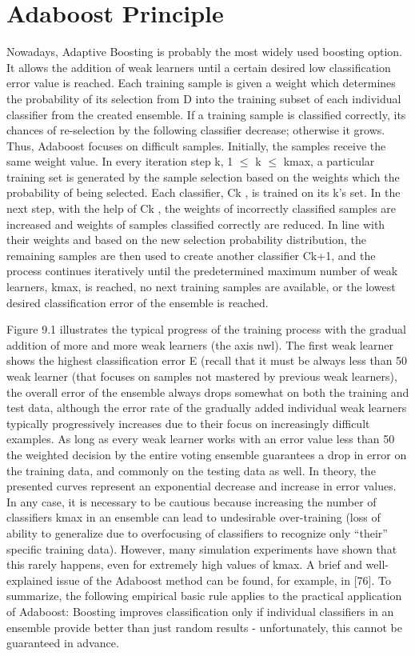 \documentclass[11pt,openany,executivepaper]{book}
\begin{document}
\section{Adaboost Principle}
Nowadays, Adaptive Boosting is probably the most widely used boosting option.
It allows the addition of weak learners until a certain desired low classification
error value is reached. Each training sample is given a weight which determines
the probability of its selection from D into the training subset of each individual
classifier from the created ensemble. If a training sample is classified correctly, its
chances of re-selection by the following classifier decrease; otherwise it grows.
Thus, Adaboost focuses on difficult samples.
Initially, the samples receive the same weight value. In every iteration step
k, 1 $\leq$ k $\leq$ kmax, a particular training set is generated by the sample selection
based on the weights which the probability of being selected. Each classifier, Ck
,
is trained on its k’s set.
In the next step, with the help of Ck
, the weights of incorrectly classified
samples are increased and weights of samples classified correctly are reduced.
In line with their weights and based on the new selection probability distribution, the remaining samples are then used to create another classifier Ck+1,
and the process continues iteratively until the predetermined maximum number
of weak learners, kmax, is reached, no next training samples are available, or the
lowest desired classification error of the ensemble is reached.

Figure 9.1 illustrates the typical progress of the training process with the
gradual addition of more and more weak learners (the axis nwl). The first weak
learner shows the highest classification error E (recall that it must be always less
than 50%
weak learner (that focuses on samples not mastered by previous weak learners),
the overall error of the ensemble always drops somewhat on both the training and
test data, although the error rate of the gradually added individual weak learners
typically progressively increases due to their focus on increasingly difficult examples. As long as every weak learner works with an error value less than 50%
the weighted decision by the entire voting ensemble guarantees a drop in error
on the training data, and commonly on the testing data as well.
In theory, the presented curves represent an exponential decrease and increase
in error values.
In any case, it is necessary to be cautious because increasing the number
of classifiers kmax in an ensemble can lead to undesirable over-training (loss of
ability to generalize due to overfocusing of classifiers to recognize only “their”
specific training data). However, many simulation experiments have shown that
this rarely happens, even for extremely high values of kmax.
A brief and well-explained issue of the Adaboost method can be found, for
example, in [76]. To summarize, the following empirical basic rule applies to the
practical application of Adaboost:
Boosting improves classification only if individual classifiers in an ensemble
provide better than just random results - unfortunately, this cannot be guaranteed
in advance.
\end{document}
